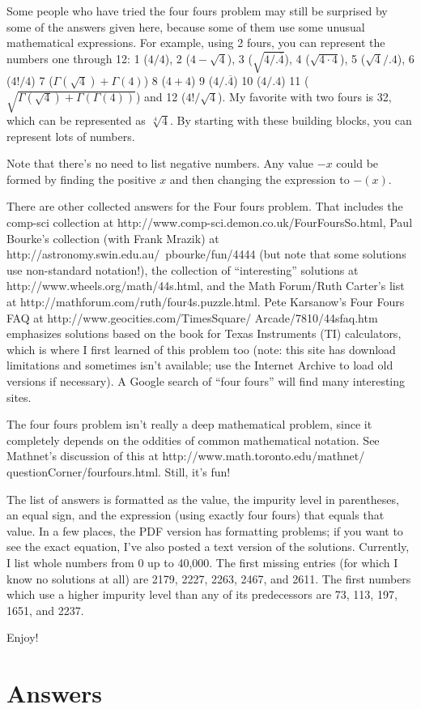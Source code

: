 \documentclass[twocolumn,twoside,draft,american]{report}
\begin{document}
Some people who have tried the four fours problem may still be
surprised by some of the answers given here, because some of them
use some unusual mathematical expressions.
For example, using 2 fours, you can represent the numbers one through 12:
1 ($4/4$),
2 ($4-{\sqrt{4}}$),
3 (${\sqrt{4/.\overline{4}}}$),
4 (${\sqrt{4 \cdot 4}}$),
5 (${\sqrt{4}}/.4$),
6 (${4!}/4$)
7 (${\Gamma({\sqrt{4}})}+{\Gamma(4)}$)
8 ($4+4$)
9 ($4/.\overline{4}$)
10 ($4/.4$)
11 (${\sqrt{{\Gamma({\sqrt{4}})}+{\Gamma({\Gamma(4)})}}}$)
and 12 (${4!}/{\sqrt{4}}$).
My favorite with two fours is 32, which can be represented as
${\sqrt[.4]{4}}$.
By starting with these building blocks, you can represent lots of numbers.

Note that there's no need to list negative numbers.
Any value $-x$ could be
formed by finding the positive $x$ and then changing the expression
to $-(x)$.

There are other collected answers for the Four fours problem.
That includes the
comp-sci collection at http://www.comp-sci.demon.co.uk/FourFoursSo.html,
Paul Bourke's collection  (with Frank Mrazik) at http://astronomy.swin.edu.au/~pbourke/fun/4444 (but note that some solutions use non-standard notation!),
the collection of ``interesting'' solutions at http://www.wheels.org/math/44s.html,
and
the Math Forum/Ruth Carter's list at http://mathforum.com/ruth/four4s.puzzle.html.
Pete Karsanow's Four Fours FAQ at
http://www.geocities.com/TimesSquare/ Arcade/7810/44sfaq.htm
emphasizes solutions based on the book for Texas Instruments
(TI) calculators, which is where I first learned of this problem too
(note: this site has download limitations and sometimes isn't available;
use the Internet Archive to load old versions if necessary).
A Google search of ``four fours'' will find many interesting sites.

The four fours problem isn't really a deep mathematical problem, since
it completely depends on the oddities of common mathematical notation.
See Mathnet's discussion of this at
http://www.math.toronto.edu/mathnet/ questionCorner/fourfours.html.
Still, it's fun!

The list of answers is formatted as the value,
the impurity level in parentheses, an equal sign, and the expression
(using exactly four fours) that equals that value.
In a few places, the PDF version has formatting problems;
if you want to see the exact equation, I've also posted a text
version of the solutions.
Currently, I list whole numbers from 0 up to 40,000.
The first missing entries (for which I know no solutions at all) are
2179,
2227,
2263,
2467,
and
2611.
The first numbers which use a higher impurity level than any
of its predecessors are 73, 113, 197, 1651, and 2237.

Enjoy!


\chapter{Answers}
\end{document}
